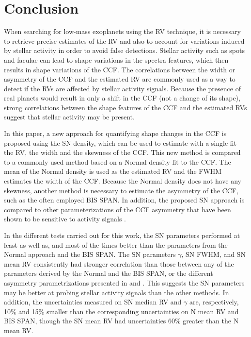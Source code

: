 \documentclass{aa}
\begin{document}







\section{Conclusion} \label{sec:conclu}

When searching for low-mass exoplanets using the RV technique, it is necessary to retrieve precise estimates of the RV and also to account for variations induced by stellar activity in order to avoid false detections.  
Stellar activity such as spots and faculae can lead to shape variations in the spectra features, which then results in shape variations of the CCF.
The correlations between the width or asymmetry of the CCF and the estimated RV are commonly used as a way to detect if the RVs are affected by stellar activity signals.   
Because the presence of real planets would result in only a shift in the CCF (not a change of its shape), strong correlations between the shape features of the CCF and the estimated RVs suggest that stellar activity may be present.



In this paper, a new approach for quantifying shape changes in the CCF is proposed using the SN density, which can be used to estimate with a single fit the RV, the width and the skewness of the CCF. 
This new method is compared to a commonly used method based on a Normal density fit to the CCF.  The mean of the Normal density is used as the estimated RV and the FWHM estimates the width of the CCF.  Because the Normal density does not have any skewness, another method is necessary to estimate the asymmetry of the CCF, such as the often employed BIS SPAN.
In addition, the proposed SN approach is compared to other parameterizations of the CCF asymmetry that have been shown to be sensitive to activity signals \citep[][]{Boisse-2011,Figueira-2013}.

In the different tests carried out for this work, the SN parameters performed at least as well as, and most of the times better than the parameters from the Normal approach and the BIS SPAN.
The SN parameters $\gamma$, SN FWHM, and SN mean RV consistently had stronger correlation than those between any of the parameters derived by the Normal and the BIS SPAN, or the different asymmetry parametrizations presented in \citet{Boisse-2011} and \citet{Figueira-2013}. 
This suggests the SN parameters may be better at probing stellar activity signals than the other methods. 
In addition, the uncertainties measured on SN median RV and $\gamma$ are, respectively, 10\% and 15\% smaller than the corresponding uncertainties on N mean RV and BIS SPAN, though the SN mean RV had uncertainties 60\% greater than the N mean RV.
\end{document}
